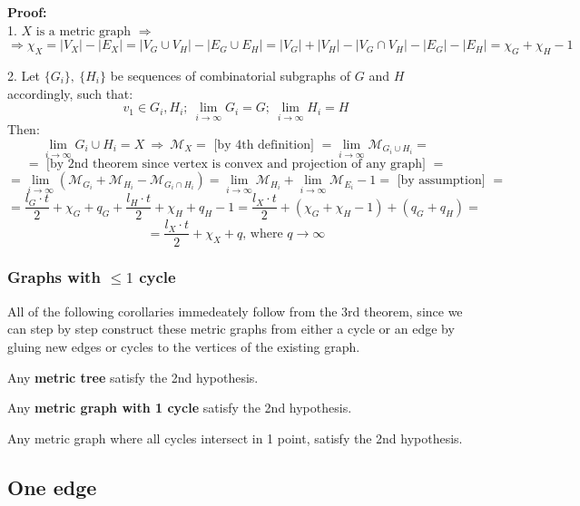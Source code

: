 \documentclass{article}
\begin{document}
\textbf{Proof:} \\

1. $X \text{ is a metric graph } \Rightarrow$
$$\Rightarrow \chi_X = |V_X| - |E_X| = |V_G \cup V_H| - |E_G \cup E_H| = |V_G| + |V_H| - 
|V_G \cap V_H| - |E_G| - |E_H| = \chi_G + \chi_H - 1$$

2. 
Let $\{G_i\}, \ \{H_i\}$ be sequences of combinatorial subgraphs of $G$ and $H$ accordingly, such that:
$$v_1 \in G_i, H_i; \ \lim_{i \rightarrow \infty} G_i = G; \  \lim_{i \rightarrow \infty} H_i = H$$
Then:
$$\lim_{i \rightarrow \infty} G_i \cup H_i = X \ \Rightarrow \ \mathcal{M}_X =
\text{ [by 4th definition] } = \lim_{i \rightarrow \infty} \mathcal{M}_{G_i \cup H_i} = $$ 
$$ = \text{ [by 2nd theorem since vertex is convex and projection of any graph] } = $$
$$ = \lim_{i \rightarrow \infty} (\mathcal{M}_{G_i} + \mathcal{M}_{H_i} - 
\mathcal{M}_{G_i \cap H_i}) = \lim_{i \rightarrow \infty} \mathcal{M}_{H_i} +
\lim_{i \rightarrow \infty} \mathcal{M}_{E_i} - 1 = \text{ [by assumption] } = $$
$$ = \frac{l_G \cdot t}{2} + \chi_G + q_G + \frac{l_H \cdot t}{2} + \chi_H + q_H - 1 = 
\frac{l_X \cdot t}{2} + (\chi_G + \chi_H - 1) + (q_G + q_H) = $$ 
$$ = \frac{l_X \cdot t}{2} + \chi_X + q \text{, where } q \rightarrow \infty$$

\subsubsection{Graphs with $\leq 1$ cycle}

All of the following corollaries immedeately follow from the 3rd theorem,
since we can step by step construct these metric graphs from either a cycle or
an edge by gluing new edges or cycles to the vertices of the existing graph. 

\begin{corollary}
    Any \textbf{metric tree} satisfy the 2nd hypothesis.
\end{corollary}

\begin{corollary}
    Any \textbf{metric graph with 1 cycle} satisfy the 2nd hypothesis.
\end{corollary}

\begin{corollary}
    Any metric graph where all cycles intersect in 1 point, satisfy the 2nd hypothesis.
\end{corollary}


\subsection{One edge}
\end{document}
